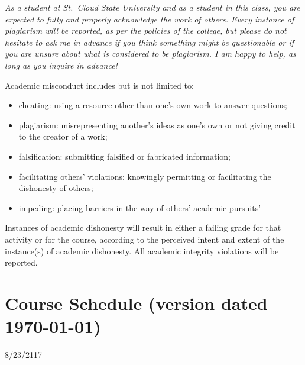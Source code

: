 \documentclass{tufte-handout}
\begin{document}
\begin{fullwidth}
\emph{As a student at St.\ Cloud State University and as a student in this class, you are expected to fully and properly acknowledge the work of others. Every instance of plagiarism will be reported, as per the policies of the college, but please do not hesitate to ask me in advance if you think something might be questionable or if you are unsure about what is considered to be plagiarism. I am happy to help, as long as you inquire in advance! }

Academic misconduct includes but is not limited to:

\begin{itemize}
	\item cheating: using a resource other than one's own work to answer questions;
	\item plagiarism: misrepresenting another's ideas as one's own or not giving credit to the creator of a work;
	\item falsification: submitting falsified or fabricated information;
	\item facilitating others' violations: knowingly permitting or facilitating the dishonesty of others;
	\item impeding: placing barriers in the way of others' academic pursuits'
\end{itemize}

Instances of academic dishonesty will result in either a failing grade for that activity or for the course, according to the perceived intent and extent of the instance(s) of academic dishonesty.
All academic integrity violations will be reported.





\newpage

\section{Course Schedule (version dated \today)}



  \setlength{\calwidth}{6.5in}
  \setlength{\calboxdepth}{0.3in}
  \begin{calendar}{8/23/21}{17}

  \calday[Monday]{\classday} %
  \calday[Tuesday]{\classday} %
  \calday[Wednesday]{\classday}
  \calday[Thursday]{\classday} %
  \calday[Friday]{\classday} %
    \skipday\skipday %



\end{calendar}
\end{fullwidth}
\end{document}
